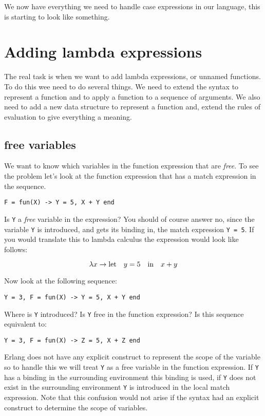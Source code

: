 \documentclass[a4paper,11pt]{article}
\begin{document}
We now have everything we need to handle case expressions in our
language, this is starting to look like something.

\section{Adding lambda expressions}

The real task is when we want to add lambda expressions, or unnamed
functions. To do this wee need to do several things. We need to extend
the syntax to represent a function and to apply a function to a
sequence of arguments. We also need to add a new data structure to
represent a function and, extend the rules of evaluation to give
everything a meaning.


\subsection{free variables}

We want to know which variables in the function expression that are
{\em free}. To see the problem let's look at the function expression
that has a match expression in the sequence.

\begin{verbatim}
F = fun(X) -> Y = 5, X + Y end
\end{verbatim}

Is {\tt Y} a {\em free} variable in the expression? You should of
course answer no, since the variable {\tt Y} is introduced, and gets
its binding in, the match expression {\tt Y = 5}. If you would
translate this to lambda calculus the expression would look like
follows:

$$ \lambda x \rightarrow {\rm let} \quad y = 5 \quad {\rm in} \quad x + y $$


Now look at the following sequence:

\begin{verbatim}
Y = 3, F = fun(X) -> Y = 5, X + Y end
\end{verbatim}

Where is {\tt Y} introduced? Is {\tt Y} free in the function
expression? Is this sequence equivalent to:

\begin{verbatim}
Y = 3, F = fun(X) -> Z = 5, X + Z end
\end{verbatim}

Erlang does not have any explicit construct to represent the scope of
the variable so to handle this we will treat {\tt Y} as a free
variable in the function expression. If {\tt Y} has a binding in the
surrounding environment this binding is used, if {\tt Y} does not exist
in the surrounding environment {\tt Y} is introduced in the local match
expression. Note that this confusion would not arise if the syntax had
an explicit construct to determine the scope of variables.
\end{document}

